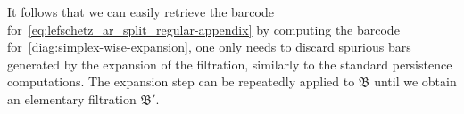 \documentclass[letterpaper,11pt]{article}
\theoremstyle{plain}
\theoremstyle{definition}
\newcounter{li}
\newcommand{\zzBD}{\mathfrak{B}}
\begin{document}
It follows that we can easily retrieve the barcode for~\eqref{eq:lefschetz_ar_split_regular-appendix}
    by computing the barcode for~\eqref{diag:simplex-wise-expansion}, 
    one only needs to discard spurious bars generated by the expansion of the filtration, 
    similarly to the standard persistence computations.
The expansion step can be repeatedly applied to $\zzBD$ until we obtain an elementary filtration $\zzBD'$.

\end{document}

